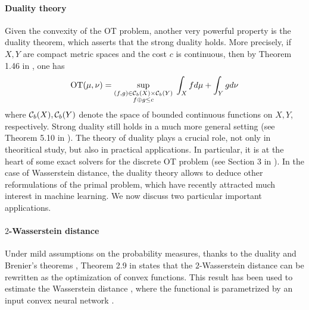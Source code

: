 \paragraph{Duality theory}
Given the convexity of the OT problem, another very powerful property
is the duality theorem, which asserts that the strong duality holds. More precisely,
if $X, Y$ are compact metric spaces and the cost $c$ is continuous, then by Theorem 1.46
in \citep{Fillipo15}, one has
\begin{align*}
  \text{OT}(\mu, \nu) = \sup_{\substack{(f, g) \in \mathcal C_b(X) \times \mathcal C_b(Y) \\ f \oplus g \leq c}} \;
  \int_X f d\mu + \int_Y g d\nu
\end{align*}
where $\mathcal C_b(X), \mathcal C_b(Y)$ denote the space of bounded continuous functions on $X, Y$, respectively.
Strong duality still holds in a much more general setting (see Theorem 5.10 in \citep{Villani08}).
The theory of duality plays a crucial role, not only in theoritical study, but also
in practical applications. In particular, it is at the heart of some exact solvers
for the discrete OT problem (see Section 3 in \citep{Peyre19}).
In the case of Wasserstein distance, the duality theory allows to deduce other reformulations
of the primal problem, which have recently attracted much interest in machine learning.
We now discuss two particular important applications.

\paragraph{$2$-Wasserstein distance}
Under mild assumptions on the probability measures, thanks to the duality and
Brenier's theorems \citep{Brenier87}, Theorem 2.9 in \citep{Villani03} states that
the $2$-Wasserstein distance can be rewritten as the optimization of convex functions.
This result has been used to estimate the Wasserstein distance
\citep{Chartrand09,Taghvaei19,Korotin19,Makkuva20},
where the functional is parametrized by an input convex neural network \citep{Amos17}.

